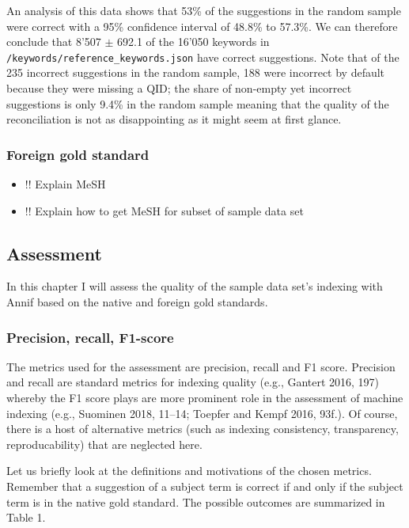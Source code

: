 An analysis of this data shows that 53\% of the suggestions in the
random sample were correct with a 95\% confidence interval of 48.8\% to
57.3\%. We can therefore conclude that 8'507 \(\pm\) 692.1 of the 16'050
keywords in \texttt{/keywords/reference\_keywords.json} have correct
suggestions. Note that of the 235 incorrect suggestions in the random
sample, 188 were incorrect by default because they were missing a QID;
the share of non-empty yet incorrect suggestions is only 9.4\% in the
random sample meaning that the quality of the reconciliation is not as
disappointing as it might seem at first glance.

\hypertarget{foreign-gold-standard}{%
\subsubsection{Foreign gold standard}\label{foreign-gold-standard}}

\begin{itemize}
\tightlist
\item
  !! Explain MeSH
\item
  !! Explain how to get MeSH for subset of sample data set
\end{itemize}

\hypertarget{assessment}{%
\subsection{Assessment}\label{assessment}}

In this chapter I will assess the quality of the sample data set's
indexing with Annif based on the native and foreign gold standards.

\hypertarget{precision-recall-f1-score}{%
\subsubsection{Precision, recall,
F1-score}\label{precision-recall-f1-score}}

The metrics used for the assessment are precision, recall and F1 score.
Precision and recall are standard metrics for indexing quality (e.g.,
Gantert 2016, 197) whereby the F1 score plays are more prominent role in
the assessment of machine indexing (e.g., Suominen 2018, 11--14; Toepfer
and Kempf 2016, 93f.). Of course, there is a host of alternative metrics
(such as indexing consistency, transparency, reproducability) that are
neglected here.

Let us briefly look at the definitions and motivations of the chosen
metrics. Remember that a suggestion of a subject term is correct if and
only if the subject term is in the native gold standard. The possible
outcomes are summarized in Table 1.

